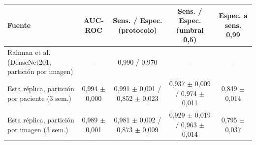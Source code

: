 \begin{tabular}{lcccc}
\toprule
Fuente & AUC-ROC & Sens. / Espec. (protocolo) & Sens. / Espec. (umbral 0,5) & Espec. a sens. 0,99 \\
\midrule
Rahman et al. (DenseNet201, partición por imagen) & -- & 0{,}990 / 0{,}970 & -- & -- \\
Esta réplica, partición por paciente (3 sem.) & 0{,}994 $\pm$ 0{,}000 & 0{,}991 $\pm$ 0{,}001 / 0{,}852 $\pm$ 0{,}023 & 0{,}937 $\pm$ 0{,}009 / 0{,}974 $\pm$ 0{,}011 & 0{,}849 $\pm$ 0{,}014 \\
Esta réplica, partición por imagen (3 sem.) & 0{,}989 $\pm$ 0{,}001 & 0{,}981 $\pm$ 0{,}002 / 0{,}873 $\pm$ 0{,}009 & 0{,}929 $\pm$ 0{,}019 / 0{,}963 $\pm$ 0{,}014 & 0{,}795 $\pm$ 0{,}037 \\
\bottomrule
\end{tabular}
